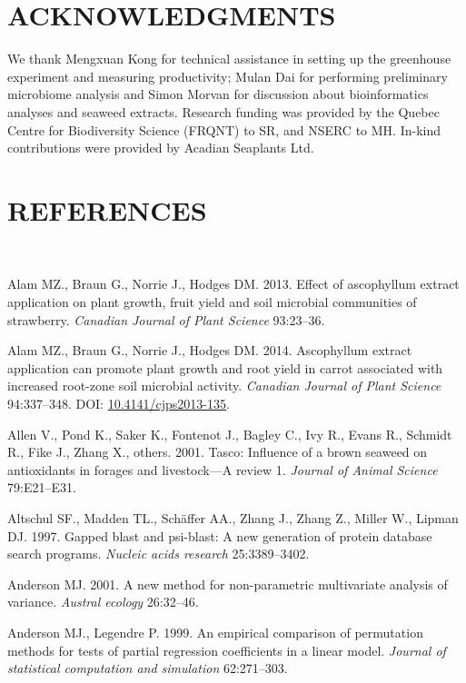 \documentclass[11pt,]{article}
\begin{document}
\section{ACKNOWLEDGMENTS}\label{acknowledgments}

We thank Mengxuan Kong for technical assistance in setting up the
greenhouse experiment and measuring productivity; Mulan Dai for
performing preliminary microbiome analysis and Simon Morvan for
discussion about bioinformatics analyses and seaweed extracts. Research
funding was provided by the Quebec Centre for Biodiversity Science
(FRQNT) to SR, and NSERC to MH. In-kind contributions were provided by
Acadian Seaplants Ltd. \newpage  

\section{REFERENCES}\label{references}

~

\hypertarget{refs}{}
\hypertarget{ref-alam2013effect}{}
Alam MZ., Braun G., Norrie J., Hodges DM. 2013. Effect of ascophyllum
extract application on plant growth, fruit yield and soil microbial
communities of strawberry. \emph{Canadian Journal of Plant Science}
93:23--36.

\hypertarget{ref-Alam2014}{}
Alam MZ., Braun G., Norrie J., Hodges DM. 2014. Ascophyllum extract
application can promote plant growth and root yield in carrot associated
with increased root-zone soil microbial activity. \emph{Canadian Journal
of Plant Science} 94:337--348. DOI:
\href{https://doi.org/10.4141/cjps2013-135}{10.4141/cjps2013-135}.

\hypertarget{ref-allen2001tasco}{}
Allen V., Pond K., Saker K., Fontenot J., Bagley C., Ivy R., Evans R.,
Schmidt R., Fike J., Zhang X., others. 2001. Tasco: Influence of a brown
seaweed on antioxidants in forages and livestock---A review 1.
\emph{Journal of Animal Science} 79:E21--E31.

\hypertarget{ref-altschul1997gapped}{}
Altschul SF., Madden TL., Schäffer AA., Zhang J., Zhang Z., Miller W.,
Lipman DJ. 1997. Gapped blast and psi-blast: A new generation of protein
database search programs. \emph{Nucleic acids research} 25:3389--3402.

\hypertarget{ref-anderson2001new}{}
Anderson MJ. 2001. A new method for non-parametric multivariate analysis
of variance. \emph{Austral ecology} 26:32--46.

\hypertarget{ref-anderson1999empirical}{}
Anderson MJ., Legendre P. 1999. An empirical comparison of permutation
methods for tests of partial regression coefficients in a linear model.
\emph{Journal of statistical computation and simulation} 62:271--303.
\end{document}
